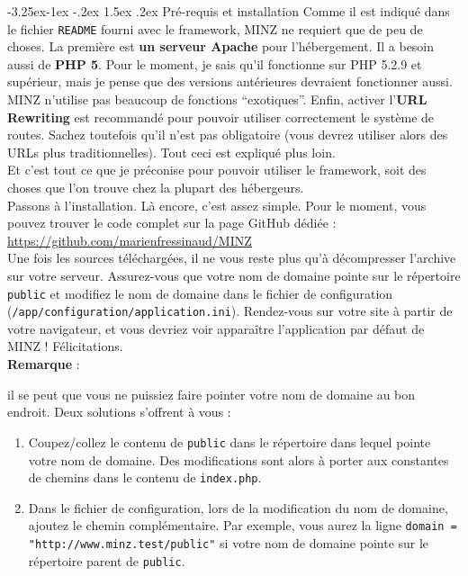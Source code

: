 \documentclass[a4paper,11pt]{article}
\makeatletter
\renewcommand{\subsection}{\@startsection{subsection}{2}{\z@}%
             {-3.25ex\@plus -1ex \@minus -.2ex}%
             {1.5ex \@plus .2ex}%
             {\color{bleuFonce}\normalfont\large\bfseries}}
\makeatother
\begin{document}
\subsection{Pré-requis et installation}
Comme il est indiqué dans le fichier \texttt{README} fourni avec le framework, MINZ ne requiert que de peu de choses. La première est \textbf{un serveur Apache} pour l'hébergement. Il a besoin aussi de \textbf{PHP 5}. Pour le moment, je sais qu'il fonctionne sur PHP 5.2.9 et supérieur, mais je pense que des versions antérieures devraient fonctionner aussi. MINZ n'utilise pas beaucoup de fonctions ``exotiques''. Enfin, activer l'\textbf{URL Rewriting} est recommandé pour pouvoir utiliser correctement le système de routes. Sachez toutefois qu'il n'est pas obligatoire (vous devrez utiliser alors des URLs plus traditionnelles). Tout ceci est expliqué plus loin.\\
Et c'est tout ce que je préconise pour pouvoir utiliser le framework, soit des choses que l'on trouve chez la plupart des hébergeurs.\\

Passons à l'installation. Là encore, c'est assez simple. Pour le moment, vous pouvez trouver le code complet sur la page GitHub dédiée :\\ \url{https://github.com/marienfressinaud/MINZ}\\

Une fois les sources téléchargées, il ne vous reste plus qu'à décompresser l'archive sur votre serveur. Assurez-vous que votre nom de domaine pointe sur le répertoire \texttt{public} et modifiez le nom de domaine dans le fichier de configuration (\texttt{/app/configuration/application.ini}). Rendez-vous sur votre site à partir de votre navigateur, et vous devriez voir apparaître l'application par défaut de MINZ ! Félicitations.\\

\textbf{Remarque} : \textcolor{grisFonce}{il se peut que vous ne puissiez faire pointer votre nom de domaine au bon endroit. Deux solutions s'offrent à vous :
\begin{enumerate}
  \item Coupez/collez le contenu de \texttt{public} dans le répertoire dans lequel pointe votre nom de domaine. Des modifications sont alors à porter aux constantes de chemins dans le contenu de \texttt{index.php}.
  \item Dans le fichier de configuration, lors de la modification du nom de domaine, ajoutez le chemin complémentaire. Par exemple, vous aurez la ligne \texttt{domain = "http://www.minz.test/public"} si votre nom de domaine pointe sur le répertoire parent de \texttt{public}.
\end{enumerate}
}
\end{document}
